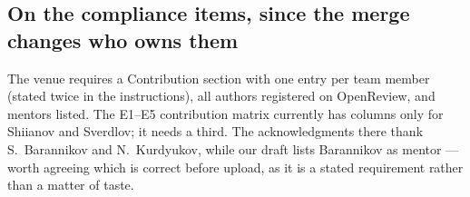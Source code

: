\documentclass[11pt,a4paper]{article}
\begin{document}
\subsection*{On the compliance items, since the merge changes who owns them}

The venue requires a Contribution section with one entry per team member (stated twice in the
instructions), all authors registered on OpenReview, and mentors listed. The E1--E5 contribution
matrix currently has columns only for Shiianov and Sverdlov; it needs a third. The acknowledgments
there thank S.\ Barannikov and N.\ Kurdyukov, while our draft lists Barannikov as mentor --- worth
agreeing which is correct before upload, as it is a stated requirement rather than a matter of
taste.
\end{document}

